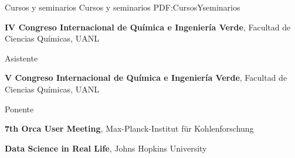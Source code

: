 \Section
{Cursos y seminarios}
{Cursos y seminarios}
{PDF:CursosYseminarios}

\Entry
{\textbf{IV Congreso Internacional de Química e Ingeniería Verde}},
\newline
Facultad de Ciencias Químicas, UANL

\Gap
\BulletItem
Asistente
\hfill
{}

\Entry
{\textbf{V Congreso Internacional de Química e Ingeniería Verde}},
\newline
Facultad de Ciencias Químicas, UANL

\Gap
\BulletItem
Ponente 
\hfill
{}

\Entry
{\textbf{7th Orca User Meeting}},
\newline
Max-Planck-Institut für Kohlenforschung

\hfill
{}

\Entry
{\textbf{Data Science in Real Life}},
\newline
Johns Hopkins University
\hfill
{}